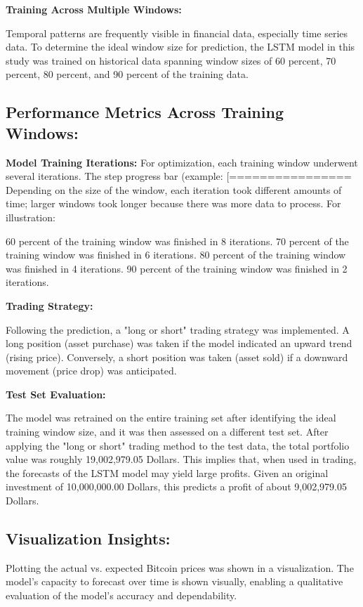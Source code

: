 \textbf{Training Across Multiple Windows:}

Temporal patterns are frequently visible in financial data, especially time series data. To determine the ideal window size for prediction, the LSTM model in this study was trained on historical data spanning window sizes of 60 percent, 70 percent, 80 percent, and 90 percent of the training data.

\subsection{Performance Metrics Across Training Windows:}

\textbf{Model Training Iterations:} For optimization, each training window underwent several iterations. The step progress bar (example: [================ Depending on the size of the window, each iteration took different amounts of time; larger windows took longer because there was more data to process. For illustration:

60 percent of the training window was finished in 8 iterations.
70 percent of the training window was finished in 6 iterations.
80 percent of the training window was finished in 4 iterations.
90 percent of the training window was finished in 2 iterations.

\textbf{Trading Strategy: }

Following the prediction, a "long or short" trading strategy was implemented. A long position (asset purchase) was taken if the model indicated an upward trend (rising price). Conversely, a short position was taken (asset sold) if a downward movement (price drop) was anticipated.

\textbf{Test Set Evaluation: }

The model was retrained on the entire training set after identifying the ideal training window size, and it was then assessed on a different test set. After applying the "long or short" trading method to the test data, the total portfolio value was roughly 19,002,979.05 Dollars. This implies that, when used in trading, the forecasts of the LSTM model may yield large profits. Given an original investment of 10,000,000.00 Dollars, this predicts a profit of about 9,002,979.05 Dollars.

\subsection{Visualization Insights: }
Plotting the actual vs. expected Bitcoin prices was shown in a visualization. The model's capacity to forecast over time is shown visually, enabling a qualitative evaluation of the model's accuracy and dependability.


